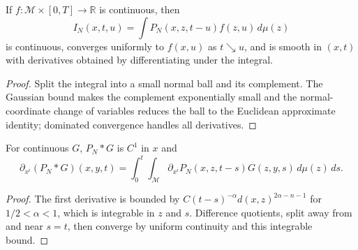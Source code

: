 \begin{lemma}
\label{lem:chow-iii-ch23-parametrix-integration-continuity}
If $f:\mathcal M\times[0,T]\to\mathbb R$ is continuous, then
\[
I_N(x,t,u)=\int P_N(x,z,t-u)f(z,u)\,d\mu(z)
\]
is continuous, converges uniformly to $f(x,u)$ as $t\searrow u$, and is smooth
in $(x,t)$ with derivatives obtained by differentiating under the integral.
\end{lemma}
\begin{proof}
Split the integral into a small normal ball and its complement.  The Gaussian
bound makes the complement exponentially small and the normal-coordinate change
of variables reduces the ball to the Euclidean approximate identity; dominated
convergence handles all derivatives.
\end{proof}

\begin{lemma}
\label{lem:chow-iii-ch23-first-convolution-derivative}
For continuous $G$, $P_N*G$ is $C^1$ in $x$ and
\[
\partial_{x^i}(P_N*G)(x,y,t)=\int_0^t\int_{\mathcal M}
\partial_{x^i}P_N(x,z,t-s)G(z,y,s)\,d\mu(z)\,ds.
\]
\end{lemma}
\begin{proof}
The first derivative is bounded by
\(C(t-s)^{-\alpha}d(x,z)^{2\alpha-n-1}\) for $1/2<\alpha<1$,
which is integrable in $z$ and $s$.  Difference quotients, split away from and
near $s=t$, then converge by uniform continuity and this integrable bound.
\end{proof}

